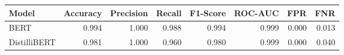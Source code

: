\begin{tabular}{|l||r|r|r|r|r|r|r|}
\toprule
Model & \textbf{Accuracy} & \textbf{Precision} & Recall & \textbf{F1-Score} & \textbf{ROC-AUC} & \textbf{FPR} & FNR \\
\midrule \midrule
BERT & 0.994 & 1.000 & 0.988 & 0.994 & 0.999 & 0.000 & 0.013 \\
DistilliBERT & 0.981 & 1.000 & 0.960 & 0.980 & 0.999 & 0.000 & 0.040 \\
\bottomrule
\end{tabular}

